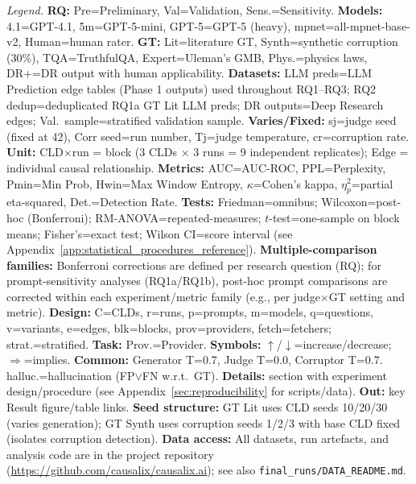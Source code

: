 \begin{landscape}
\begin{table}[H]
\vspace{0.3em}
\begin{minipage}{\linewidth}
\scriptsize
\textit{Legend.} 
\textbf{RQ:} Pre=Preliminary, Val=Validation, Sens.=Sensitivity.
\textbf{Models:} 4.1=GPT-4.1, 5m=GPT-5-mini, GPT-5=GPT-5 (heavy), mpnet=all-mpnet-base-v2, Human=human rater.
\textbf{GT:} Lit=literature GT, Synth=synthetic corruption (30\%), TQA=TruthfulQA, Expert=Uleman's GMB, Phys.=physics laws, DR+=DR output with human applicability.
\textbf{Datasets:} LLM preds=LLM Prediction edge tables (Phase 1 outputs) used throughout RQ1--RQ3; RQ2 dedup=deduplicated RQ1a GT Lit LLM preds; DR outputs=Deep Research edges; Val.\ sample=stratified validation sample.
\textbf{Varies/Fixed:} sj=judge seed (fixed at 42), Corr seed=run number, Tj=judge temperature, cr=corruption rate.
\textbf{Unit:} CLD$\times$run = block (3 CLDs $\times$ 3 runs = 9 independent replicates); Edge = individual causal relationship.
\textbf{Metrics:} AUC=AUC-ROC, PPL=Perplexity, Pmin=Min Prob, Hwin=Max Window Entropy, $\kappa$=Cohen's kappa, $\eta^2_p$=partial eta-squared, Det.=Detection Rate.
\textbf{Tests:} Friedman=omnibus; Wilcoxon=post-hoc (Bonferroni); RM-ANOVA=repeated-measures; $t$-test=one-sample on block means; Fisher's=exact test; Wilson CI=score interval (see Appendix~\ref{app:statistical_procedures_reference}).
\textbf{Multiple-comparison families:} Bonferroni corrections are defined per research question (RQ); for prompt-sensitivity analyses (RQ1a/RQ1b), post-hoc prompt comparisons are corrected within each experiment/metric family (e.g., per judge$\times$GT setting and metric).
\textbf{Design:} C=CLDs, r=runs, p=prompts, m=models, q=questions, v=variants, e=edges, blk=blocks, prov=providers, fetch=fetchers; strat.=stratified. \textbf{Task:} Prov.=Provider. \textbf{Symbols:} $\uparrow$/$\downarrow$=increase/decrease; $\Rightarrow$=implies.
\textbf{Common:} Generator T=0.7, Judge T=0.0, Corruptor T=0.7. halluc.=hallucination (FP$\lor$FN w.r.t.\ GT).
\textbf{Details:} section with experiment design/procedure (see Appendix~\ref{sec:reproducibility} for scripts/data). \textbf{Out:} key Result figure/table links.
\textbf{Seed structure:} GT Lit uses CLD seeds 10/20/30 (varies generation); GT Synth uses corruption seeds 1/2/3 with base CLD fixed (isolates corruption detection).
\textbf{Data access:} All datasets, run artefacts, and analysis code are in the project repository (\url{https://github.com/causalix/causalix.ai}); see also \texttt{final\_runs/DATA\_README.md}.
\end{minipage}
\end{table}
\end{landscape}


